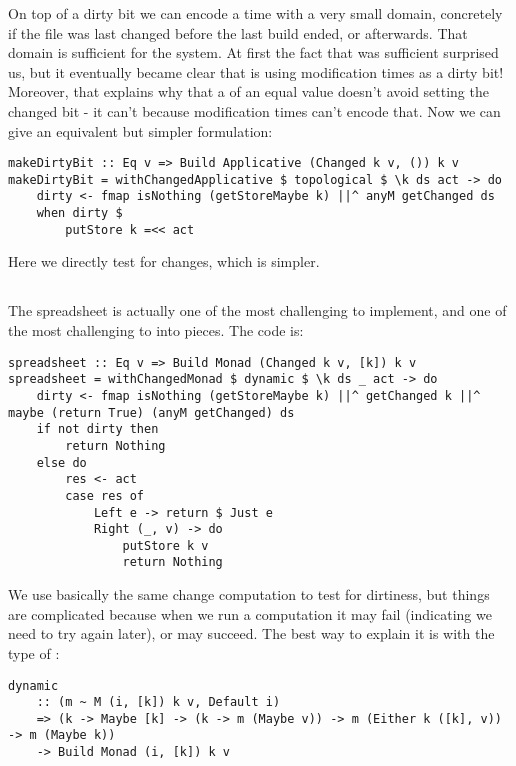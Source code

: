 On top of a dirty bit we can encode a time with a very small domain, concretely if the file was last changed before the last build ended, or afterwards. That domain is sufficient for the \Make system. At first the fact that was sufficient surprised us, but it eventually became clear that \Make is using modification times as a dirty bit! Moreover, that explains why that a  of an equal value doesn't avoid setting the changed bit - it can't because modification times can't encode that. Now we can give an equivalent but simpler formulation:

\begin{verbatim}
makeDirtyBit :: Eq v => Build Applicative (Changed k v, ()) k v
makeDirtyBit = withChangedApplicative $ topological $ \k ds act -> do
    dirty <- fmap isNothing (getStoreMaybe k) ||^ anyM getChanged ds
    when dirty $
        putStore k =<< act
\end{verbatim}

Here we directly test for changes, which is simpler.

\subsection{\Excel}\label{sec-implementation-excel}

The spreadsheet is actually one of the most challenging to implement, and one of the most challenging to into pieces. The code is:

\begin{verbatim}
spreadsheet :: Eq v => Build Monad (Changed k v, [k]) k v
spreadsheet = withChangedMonad $ dynamic $ \k ds _ act -> do
    dirty <- fmap isNothing (getStoreMaybe k) ||^ getChanged k ||^ maybe (return True) (anyM getChanged) ds
    if not dirty then
        return Nothing
    else do
        res <- act
        case res of
            Left e -> return $ Just e
            Right (_, v) -> do
                putStore k v
                return Nothing
\end{verbatim}

We use basically the same change computation to test for dirtiness, but things are complicated because when we run a computation it may fail (indicating we need to try again later), or may succeed. The best way to explain it is with the type of :

\begin{verbatim}
dynamic
    :: (m ~ M (i, [k]) k v, Default i)
    => (k -> Maybe [k] -> (k -> m (Maybe v)) -> m (Either k ([k], v)) -> m (Maybe k))
    -> Build Monad (i, [k]) k v
\end{verbatim}

